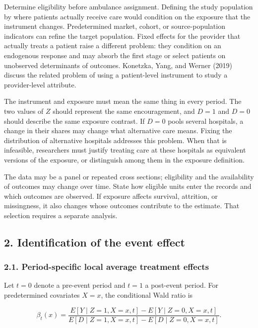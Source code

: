 \documentclass[
  11pt,
]{article}
\begin{document}
Determine eligibility before ambulance assignment. Defining the study
population by where patients actually receive care would condition on
the exposure that the instrument changes. Predetermined market, cohort,
or source-population indicators can refine the target population. Fixed
effects for the provider that actually treats a patient raise a
different problem: they condition on an endogenous response and may
absorb the first stage or select patients on unobserved determinants of
outcomes. Konetzka, Yang, and Werner (2019) discuss the related problem
of using a patient-level instrument to study a provider-level attribute.

The instrument and exposure must mean the same thing in every period.
The two values of \(Z\) should represent the same encouragement, and
\(D=1\) and \(D=0\) should describe the same exposure contrast. If
\(D=0\) pools several hospitals, a change in their shares may change
what alternative care means. Fixing the distribution of alternative
hospitals addresses this problem. When that is infeasible, researchers
must justify treating care at these hospitals as equivalent versions of
the exposure, or distinguish among them in the exposure definition.

The data may be a panel or repeated cross sections; eligibility and the
availability of outcomes may change over time. State how eligible units
enter the records and which outcomes are observed. If exposure affects
survival, attrition, or missingness, it also changes whose outcomes
contribute to the estimate. That selection requires a separate analysis.

\hypertarget{identification-of-the-event-effect}{%
\subsection{2. Identification of the event
effect}\label{identification-of-the-event-effect}}

\hypertarget{period-specific-local-average-treatment-effects}{%
\subsubsection{2.1. Period-specific local average treatment
effects}\label{period-specific-local-average-treatment-effects}}

Let \(t=0\) denote a pre-event period and \(t=1\) a post-event period.
For predetermined covariates \(X=x\), the conditional Wald ratio is

\[
\beta_t(x)=
\frac{E[Y\mid Z=1,X=x,t]-E[Y\mid Z=0,X=x,t]}
{E[D\mid Z=1,X=x,t]-E[D\mid Z=0,X=x,t]}.
\tag{1}
\]
\end{document}
